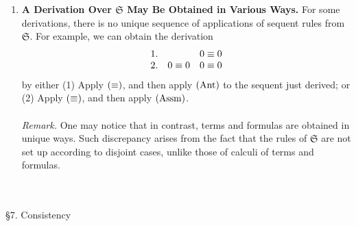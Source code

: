 \begin{enumerate}[1.]
%
\item \textbf{A Derivation Over $\mathfrak{S}$ May Be Obtained in Various Ways.} For some derivations, there is no unique sequence of applications of sequent rules from $\mathfrak{S}$. For example, we can obtain the derivation
\[
\begin{array}{lll}
1. & \ & 0 \equiv 0 \cr
2. & 0 \equiv 0 & 0 \equiv 0
\end{array}
\]
by either (1) Apply ${(\equiv)}$, and then apply ${(\mathrm{Ant})}$ to the sequent just derived; or (2) Apply ${(\equiv)}$, and then apply ${(\mathrm{Assm})}$.\\
\ \\
\textit{Remark.} One may notice that in contrast, terms and formulas are obtained in unique ways. Such discrepancy arises from the fact that the rules of $\mathfrak{S}$ are not set up according to disjoint cases, unlike those of calculi of terms and formulas.
\end{enumerate}
\ 
\\
\\
\newpage\noindent
{\large \S7. Consistency}
